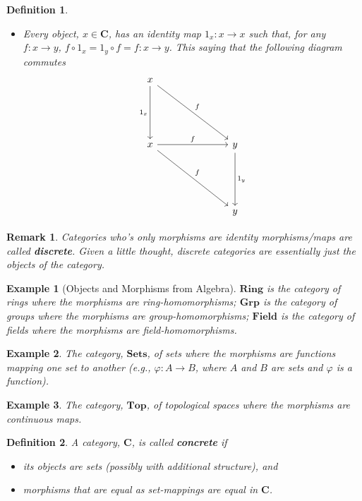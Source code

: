 \documentclass[12pt,reqno]{amsart}
\theoremstyle{plain}
\newtheorem{defi}{Definition}
\newtheorem{rem}{Remark}
\newtheorem{ex}{Example}
\newcommand{\cat}{\mathbf{C}}
\newcommand{\ca}{\mathbf}
\begin{document}
\begin{defi}
\begin{itemize}
\[\]
\item[\textup{(iiii)}] Every object, $x \in \cat$, has an identity map $1_x \colon x \to x$ such that, for any $f \colon x \to y$, $f \circ 1_x = 1_y \circ f = f \colon x \to y$. This saying that the following diagram commutes
\[
\begin{tikzcd}
x \arrow[ddd, "1_x"'] \arrow[rrrddd, "f"] &  &  &                    \\
                                        &  &  &                    \\
                                        &  &  &                    \\
x \arrow[rrrddd, "f"] \arrow[rrr, "f"]  &  &  & y \arrow[ddd, "1_y"] \\
                                        &  &  &                    \\
                                        &  &  &                    \\
                                        &  &  & y                 
\end{tikzcd}
\]
\end{itemize}
\end{defi} 
\begin{rem} Categories who's only morphisms are identity morphisms/maps are called \textbf{discrete}. Given a little thought, discrete categories are essentially just the objects of the category. 
\end{rem} 
\begin{ex}[Objects and Morphisms from Algebra] $\ca {Ring}$ is the category of rings where the morphisms are ring-homomorphisms; $\ca {Grp}$ is the category of groups where the morphisms are group-homomorphisms; $\ca {Field}$ is the category of fields where the morphisms are field-homomorphisms. 
\end{ex} 
\begin{ex} The category, $\ca {Sets}$, of sets where the morphisms are functions mapping one set to another (e.g., $\varphi \colon A \to B$, where $A$ and $B$ are sets and $\varphi$ is a function).
\end{ex}
\begin{ex} The category, $\ca{Top}$, of topological spaces where the morphisms are continuous maps. 
\end{ex} 
\begin{defi} A category, $\cat$, is called \textbf{concrete} if 
\begin{itemize}
\item[\textup{(i)}] its objects are sets (possibly with additional structure), and
\item[\textup{(ii)}] morphisms that are equal as set-mappings are equal in $\cat$. 
\end{itemize}
\end{defi} 
\end{document}
